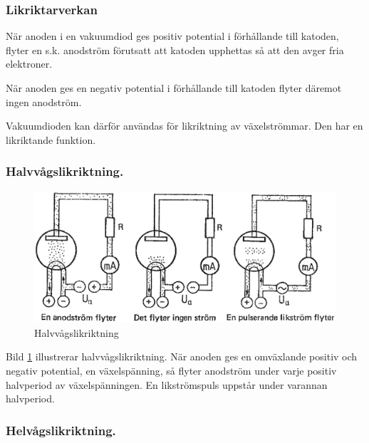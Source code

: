 \subsubsection{Likriktarverkan}

När anoden i en vakuumdiod ges positiv potential i förhållande till katoden,
flyter en s.k. anodström förutsatt att katoden upphettas så att den avger fria
elektroner.

När anoden ges en negativ potential i förhållande till katoden flyter däremot
ingen anodström.

Vakuumdioden kan därför användas för likriktning av växelströmmar. Den har en
likriktande funktion.

\subsubsection{Halvvågslikriktning.}

\begin{figure}
\includegraphics[width=\textwidth]{images/cropped_pdfs/bild_2_2-27.pdf}
\caption{Halvvågslikriktning}
\label{fig:BildII2-27}
\end{figure}

Bild \ref{fig:BildII2-27} illustrerar halvvågslikriktning.
När anoden ges en omväxlande positiv och negativ potential, en växelspänning, så
flyter anodström under varje positiv halvperiod av växelspänningen.
En likströmspuls uppstår under varannan halvperiod.

\subsubsection{Helvågslikriktning.}


